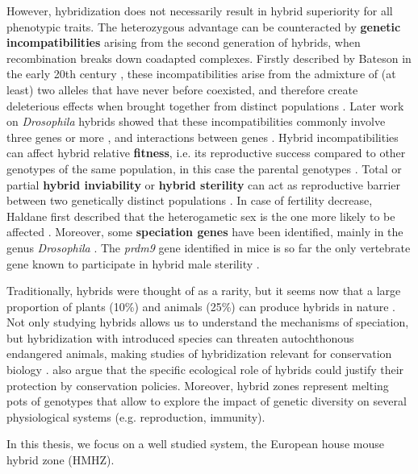 However, hybridization does not necessarily result in hybrid superiority for all phenotypic traits. The heterozygous advantage can be counteracted by \textbf{genetic incompatibilities} arising from the second generation of hybrids, when recombination breaks down coadapted complexes. Firstly described by Bateson in the early 20th century \citep{bateson_heredity_1909}, these incompatibilities arise from the admixture of (at least) two alleles that have never before coexisted, and therefore create deleterious effects when brought together from distinct populations \citep{dobzhansky_studies_1936, muller_isolating_1942, orr_population_1995}. Later work on \textit{Drosophila} hybrids showed that these incompatibilities commonly involve three genes or more \citep{cabot_genetics_1994, palopoli_genetics_1994}, and interactions between genes \parencite[\textbf{negative epistasis};][]{larson_evolution_2018}. Hybrid incompatibilities can affect hybrid relative \textbf{fitness}, i.e. its reproductive success compared to other genotypes of the same population, in this case the parental genotypes \citep{krimbas_fitness_2001}. Total or partial \textbf{hybrid inviability} or \textbf{hybrid sterility} can act as reproductive barrier between two genetically distinct populations \citep{coyne_reproductive_2001}. In case of fertility decrease, Haldane first described that the heterogametic sex is the one more likely to be affected \citep{haldane_sex_1922}. Moreover, some \textbf{speciation genes} \parencite[genes underlying reproductive isolation;][]{wu_genes_2004} have been identified, mainly in the genus \textit{Drosophila} \citep{oliver_accelerated_2009}. The \textit{prdm9} gene identified in mice is so far the only vertebrate gene known to participate in hybrid male sterility \citep{mihola_mouse_2009}. 
\par
Traditionally, hybrids were thought of as a rarity, but it seems now that a large proportion of plants (10\%) and animals (25\%) can produce hybrids in nature \citep{mallet_hybridization_2005}. Not only studying hybrids allows us to understand the mechanisms of speciation, but hybridization with introduced species can threaten autochthonous endangered animals, making studies of hybridization relevant for conservation biology \citep{simberloff_hybridization_1996}. \cite{stronen_perspectives_2013} also argue that the specific ecological role of hybrids could justify their protection by conservation policies. Moreover, hybrid zones represent melting pots of genotypes that allow to explore the impact of genetic diversity on several physiological systems (e.g. reproduction, immunity).
\par
In this thesis, we focus on a well studied system, the European house mouse hybrid zone (HMHZ).


